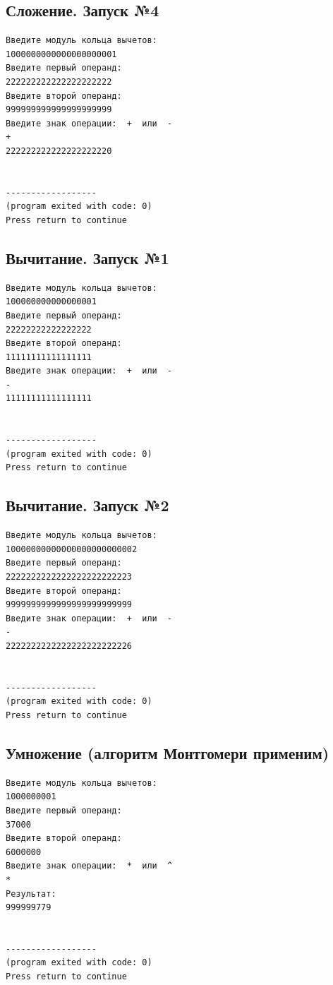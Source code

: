 \documentclass[a4paper,12pt]{article} %
\begin{document}
\subsection*{Сложение. Запуск №4}
\begin{verbatim}
Введите модуль кольца вычетов:
1000000000000000000001
Введите первый операнд:
222222222222222222222
Введите второй операнд:
999999999999999999999
Введите знак операции:  +  или  -
+
222222222222222222220


------------------
(program exited with code: 0)
Press return to continue
\end{verbatim}


\subsection*{Вычитание. Запуск №1}
\begin{verbatim}
Введите модуль кольца вычетов:
100000000000000001
Введите первый операнд:
22222222222222222
Введите второй операнд:
11111111111111111
Введите знак операции:  +  или  -
-
11111111111111111


------------------
(program exited with code: 0)
Press return to continue
\end{verbatim}

\subsection*{Вычитание. Запуск №2}
\begin{verbatim}
Введите модуль кольца вычетов:
10000000000000000000000002
Введите первый операнд:
2222222222222222222222223
Введите второй операнд:
9999999999999999999999999
Введите знак операции:  +  или  -
-
2222222222222222222222226


------------------
(program exited with code: 0)
Press return to continue
\end{verbatim}

\subsection*{Умножение (алгоритм Монтгомери применим)}
\begin{verbatim}
Введите модуль кольца вычетов:
1000000001
Введите первый операнд:
37000
Введитe второй операнд:
6000000
Введите знак операции:  *  или  ^
*
Результат:
999999779


------------------
(program exited with code: 0)
Press return to continue
\end{verbatim}
\end{document}
